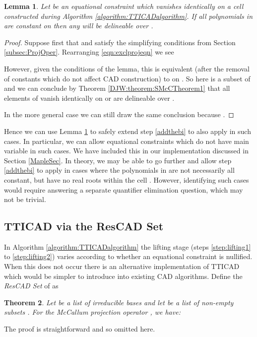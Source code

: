 \documentclass{article}
\newtheorem{theorem}{Theorem}
\newtheorem{lemma}[theorem]{Lemma}
\begin{document}
\begin{lemma}\label{lemma:constpolys}
Let  be an equational constraint which vanishes identically on a cell  constructed during Algorithm \ref{algorithm:TTICADalgorithm}. If all polynomials in  are constant on  then any  will be delineable over . 
\end{lemma}

\begin{proof}
Suppose first that  and  satisfy the simplifying conditions from Section \ref{subsec:ProjOper}. Rearranging \eqref{eqn:exclprojeqn} we see
  

However, given the conditions of the lemma, this is equivalent (after the removal of constants which do not affect CAD construction) to  on .  So here  is a subset of  and we can conclude by Theorem \ref{DJW:theorem:SMcCTheorem1} that all elements of  vanish identically on  or are delineable over . 

In the more general case we can still draw the same conclusion because .
\end{proof}

Hence we can use Lemma \ref{lemma:constpolys} to safely extend step \ref{addthebi} to also apply in such cases. In particular, we can allow equational constraints  which do not have main variable  in such cases. We have included this in our implementation discussed in Section \ref{MapleSec}.
In  theory, we may be able to go further and allow step \ref{addthebi} to apply in cases where the polynomials in  are not necessarily all constant, but have no real roots within the cell . However, identifying such cases would require answering a separate quantifier elimination question, which may not be trivial. 

\subsection{TTICAD via the ResCAD Set}

In Algorithm \ref{algorithm:TTICADalgorithm} the lifting stage (steps \ref{step:lifting1} to \ref{step:lifting2}) varies according to whether an equational constraint is nullified.  When this does not occur there is an alternative implementation of TTICAD which would be simpler to introduce into existing CAD algorithms.  
Define the {\em ResCAD Set} of  as


\begin{theorem} \label{THEOREM:PROJEQUALSRES}
   Let  be a list of irreducible bases 
and let  be a list of non-empty subsets
.   
  For the McCallum projection operator , \cite{McCallum1988} we have:
  
\end{theorem}
The proof is straightforward and so omitted here.  
\end{document}
